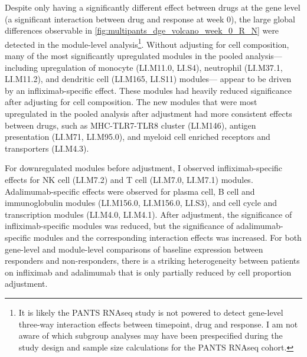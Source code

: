 Despite only  having a significantly different effect between drugs at the gene level (a significant interaction between drug and response at week 0), 
the large global differences observable in \cref{fig:multipants_dge_volcano_week_0_R_N} were detected in the module-level analysis\footnote{
    It is likely the \gls{PANTS} \gls{RNAseq} study is not powered to detect gene-level three-way interaction effects between timepoint, drug and response.
    I am not aware of which subgroup analyses may have been prespecified during the study design and sample size calculations for the \gls{PANTS} \gls{RNAseq} cohort.
}.
Without adjusting for cell composition, many of the most significantly upregulated modules in the pooled analysis---%
including upregulation of monocyte (LI.M11.0, LI.S4), neutrophil (LI.M37.1, LI.M11.2), and dendritic cell (LI.M165, LI.S11) modules---%
appear to be driven by an infliximab-specific effect.
These modules had heavily reduced significance after adjusting for cell composition.
The new modules that were most upregulated in the pooled analysis after adjustment had more consistent effects between drugs, 
such as MHC-TLR7-TLR8 cluster (LI.M146), antigen presentation (LI.M71, LI.M95.0), and myeloid cell enriched receptors and transporters (LI.M4.3).

For downregulated modules before adjustment, I observed infliximab-specific effects for \gls{NK} cell (LI.M7.2) and T cell (LI.M7.0, LI.M7.1) modules.
Adalimumab-specific effects were observed for plasma cell, B cell and immunoglobulin modules (LI.M156.0, LI.M156.0, LI.S3), and cell cycle and transcription modules (LI.M4.0, LI.M4.1).
After adjustment, the significance of infliximab-specific modules was reduced, 
but the significance of adalimumab-specific modules and the corresponding interaction effects was increased.
For both gene-level and module-level comparisons of baseline expression between responders and non-responders, there is a striking heterogeneity between patients on infliximab and adalimumab that is only partially reduced by cell proportion adjustment.

